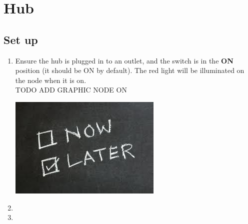   \section{Hub}
  \subsection{Set up}
    \begin{enumerate}
      \item Ensure the hub is plugged in to an outlet, and the switch is in the \textbf{ON} position 
      (it should be ON by default).
      The red light will be illuminated on the node when it is on.\\ 
TODO ADD GRAPHIC NODE ON\\
      \begin{center}
      \includegraphics[scale=1]{images/Now-Later.png}
    \end{center}

      \item

      \item
    \end{enumerate}
